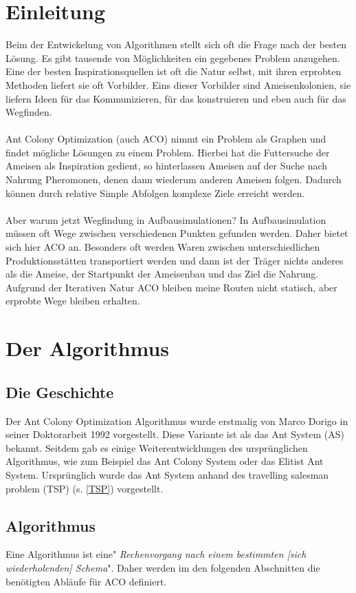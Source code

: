 \documentclass[12pt]{article}
\begin{document}
\thispagestyle{empty}
\tableofcontents
\pagebreak


\section{Einleitung} \label{Einleitung}
Beim der Entwickelung von Algorithmen stellt sich oft die Frage nach der besten Lösung. Es gibt tausende von Möglichkeiten ein gegebenes Problem anzugehen. Eine der besten Inspirationsquellen ist oft die Natur selbst, mit ihren erprobten Methoden liefert sie oft Vorbilder. Eins dieser Vorbilder sind Ameisenkolonien, sie liefern Ideen für das Kommunizieren, für das konstruieren und eben auch für das Wegfinden.\\\\
Ant Colony Optimization (auch ACO) nimmt ein Problem als Graphen und findet mögliche Lösungen zu einem Problem. Hierbei hat die Futtersuche der Ameisen als Inspiration gedient, so hinterlassen Ameisen auf der Suche nach Nahrung Pheromonen, denen dann wiederum anderen Ameisen folgen. Dadurch können durch relative Simple Abfolgen komplexe Ziele erreicht werden.\\\\
Aber warum jetzt Wegfindung in Aufbausimulationen? In Aufbausimulation müssen oft Wege zwischen verschiedenen Punkten gefunden werden. Daher bietet sich hier ACO an. Besonders oft werden Waren zwischen unterschiedlichen Produktionsstätten transportiert werden und dann ist der Träger nichts anderes als die Ameise, der Startpunkt der Ameisenbau und das Ziel die Nahrung. Aufgrund der Iterativen Natur ACO bleiben meine Routen nicht statisch, aber erprobte Wege bleiben erhalten.
\section{Der Algorithmus}
\subsection{Die Geschichte}\label{Geschichte}
Der Ant Colony Optimization Algorithmus wurde erstmalig von Marco Dorigo in seiner Doktorarbeit 1992 vorgestellt. Diese Variante ist als das Ant System (AS) bekannt. Seitdem gab es einige Weiterentwicklungen des ursprünglichen Algorithmus, wie zum Beispiel das Ant Colony System oder das Elitist Ant System.
Ursprünglich wurde das Ant System anhand des travelling salesman problem (TSP) (s. \ref{TSP}) vorgestellt.
\subsection{Algorithmus}
Eine Algorithmus ist eine"\textit{ Rechenvorgang nach einem bestimmten [sich wiederholenden] Schema}"\cite{duden_algo}. Daher werden im den folgenden Abschnitten die benötigten Abläufe für ACO definiert.
\end{document}
